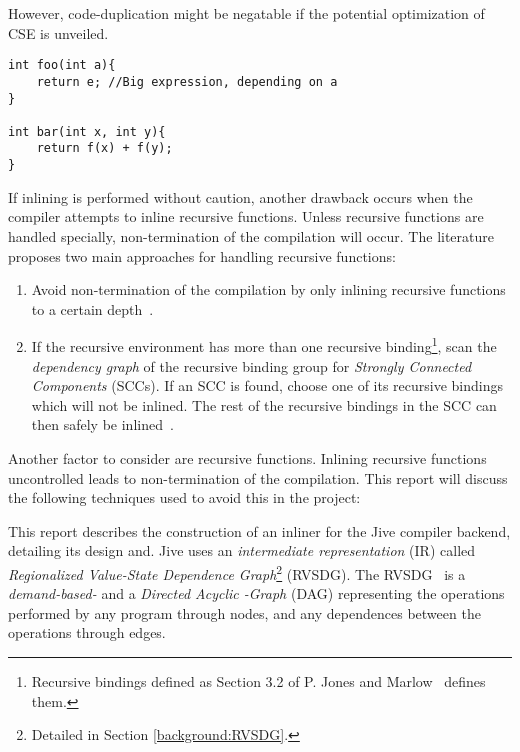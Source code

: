 However, code-duplication might be negatable if the potential optimization of
CSE is unveiled.

\begin{lstlisting}[label={lst:code-dup}, style=global_customcpp,
caption={Code duplication in \lstinline!bar()!, when inlining \lstinline!foo()!
into \lstinline!bar()!.}]
int foo(int a){
	return e; //Big expression, depending on a
}

int bar(int x, int y){
	return f(x) + f(y);
}
\end{lstlisting}
\vspace{-3\parskip} %

If inlining is performed without caution, another drawback occurs when the
compiler attempts to inline recursive functions. Unless recursive functions are
handled specially, non-termination of the compilation will occur. The literature
proposes two main approaches for handling recursive functions:

\begin{enumerate}

	\item Avoid non-termination of the compilation by only inlining recursive
functions to a certain depth~\cite{GHCPaper}\cite{InlineWhenHowSerrano}.

	\item If the recursive environment has more than one recursive
binding\footnote{Recursive bindings defined as Section 3.2 of P. Jones and
Marlow~\cite{GHCPaper} defines them.}, scan the \textit{dependency graph} of the
recursive binding group for \textit{Strongly Connected Components} (SCCs). If an
SCC is found, choose one of its recursive bindings which will not be inlined.
The rest of the recursive bindings in the SCC can then safely be
inlined~\cite{BasMscThesis}\cite{GHCPaper}.

\end{enumerate}

Another factor to consider are recursive functions. Inlining recursive functions
uncontrolled leads to non-termination of the compilation. This report will
discuss the following techniques used to avoid this in the project:

This report describes the construction of an inliner for the Jive compiler
backend, detailing its design and. Jive uses an \textit{intermediate
representation} (IR) called \textit{Regionalized Value-State Dependence
Graph}\footnote{Detailed in Section \ref{background:RVSDG}.} (RVSDG). The
RVSDG~\cite{RVSDG:HiPEACpaper} is a \textit{demand-based-} and a \textit{Directed
Acyclic \mbox{-Graph}} (DAG) representing the operations performed by any program
through nodes, and any dependences between the operations through edges.

